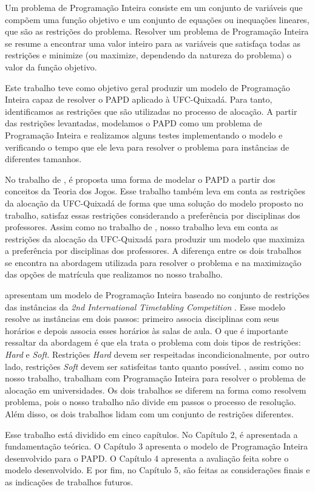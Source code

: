 Um problema de Programação Inteira consiste em um conjunto de variáveis que compõem uma função objetivo e um conjunto de equações ou inequações lineares, que são as restrições do problema. Resolver um problema de Programação Inteira se resume a encontrar uma valor inteiro para as variáveis que satisfaça todas as restrições e minimize (ou maximize, dependendo da natureza do problema) o valor da função objetivo.

Este trabalho teve como objetivo geral produzir um modelo de Programação Inteira capaz de resolver o PAPD aplicado à UFC-Quixadá. Para tanto, identificamos as restrições que são utilizadas no processo de alocação. A partir das restrições levantadas, modelamos o PAPD como um problema de Programação Inteira e realizamos alguns testes implementando o modelo e verificando o tempo que ele leva para resolver o problema para instâncias de diferentes tamanhos.

No trabalho de , é proposta uma forma de modelar o PAPD a partir dos conceitos da Teoria dos Jogos. Esse trabalho também leva em conta as restrições da alocação da UFC-Quixadá de forma que uma solução do modelo proposto no trabalho, satisfaz essas restrições considerando a preferência por disciplinas dos professores. Assim como no trabalho de , nosso trabalho leva em conta as restrições da alocação da UFC-Quixadá para produzir um modelo que maximiza a preferência por disciplinas dos professores. A diferença entre os dois trabalhos se encontra na abordagem utilizada para resolver o problema e na maximização das opções de matrícula que realizamos no nosso trabalho. 

 apresentam um modelo de Programação Inteira baseado no conjunto de restrições das instâncias da \textit{2nd International Timetabling Competition} \cite{itc}. Esse modelo resolve as instâncias em dois passos: primeiro  associa disciplinas com seus horários e depois associa esses horários às salas de aula. O que é importante ressaltar da abordagem é que ela trata o problema com dois tipos de restrições: \textit{Hard} e \textit{Soft}. Restrições \textit{Hard} devem ser respeitadas incondicionalmente, por outro lado, restrições \textit{Soft} devem ser satisfeitas tanto quanto possível. , assim como no nosso trabalho, trabalham com Programação Inteira para resolver o problema de alocação em universidades. Os dois trabalhos se diferem na forma como resolvem problema, pois o nosso trabalho não divide em passos o processo de resolução. Além disso, os dois trabalhos lidam com um conjunto de restrições diferentes.

Esse trabalho está dividido em cinco capítulos. No Capítulo 2, é apresentada a fundamentação teórica. O Capítulo 3 apresenta o modelo de Programação Inteira desenvolvido para o PAPD. O Capítulo 4 apresenta a avaliação feita sobre o modelo desenvolvido. E por fim, no Capítulo 5, são feitas as considerações finais e as indicações de trabalhos futuros.

	